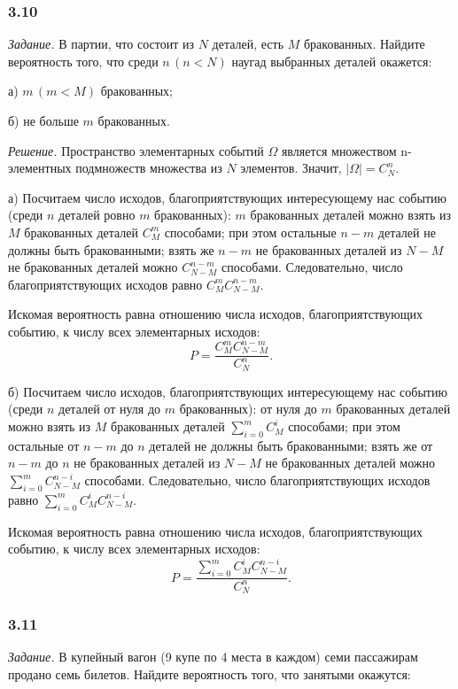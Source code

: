 \documentclass{book}
\begin{document}
\subsubsection*{3.10}

\textit{Задание.} В партии, что состоит из $N$ деталей, есть $M$ бракованных.
Найдите вероятность того, что среди $n \, \left( n < N \right)$ наугад выбранных деталей окажется:

а) $m \, \left( m < M \right) $ бракованных;

б) не больше $m$ бракованных.

\textit{Решение.} Пространство элементарных событий $ \Omega $ является множеством n-элементных подмножеств множества из $N$ элементов.
Значит, $| \Omega | = C_N^n$.

а) Посчитаем число исходов,
благоприятствующих интересующему нас событию
(среди $n$ деталей ровно $m$ бракованных):
$m$ бракованных деталей можно взять из $M$ бракованных деталей $C_M^m$ способами;
при этом остальные $n - m$ деталей не должны быть бракованными;
взять же $n - m$ не бракованных деталей из $N - M$ не бракованных деталей можно $C_{N-M}^{n-m}$ способами.
Следовательно, число благоприятствующих исходов равно $C_M^m C_{N-M}^{n-m}$.

Искомая вероятность равна отношению числа исходов, благоприятствующих событию, к числу всех элементарных исходов:
$$P =
\frac{C_M^m C_{N-M}^{n-m}}{C_N^n}.$$

б) Посчитаем число исходов,
благоприятствующих интересующему нас событию
(среди $n$ деталей от нуля до $m$ бракованных):
от нуля до $m$ бракованных деталей можно взять из $M$ бракованных деталей $ \sum \limits_{i=0}^m C_M^i$ способами;
при этом остальные от $n - m$ до $n$ деталей не должны быть бракованными;
взять же от $n - m$ до $n$ не бракованных деталей из $N - M$ не бракованных деталей можно $ \sum \limits_{i=0}^m C_{N-M}^{n-i}$ способами.
Следовательно, число благоприятствующих исходов равно $ \sum \limits_{i=0}^m C_M^i C_{N-M}^{n-i}$.

Искомая вероятность равна отношению числа исходов, благоприятствующих событию, к числу всех элементарных исходов:
$$P =
\frac{ \sum \limits_{i=0}^m C_M^i C_{N-M}^{n-i}}{C_N^n}.$$

\subsubsection*{3.11}

\textit{Задание.} В купейный вагон (9 купе по 4 места в каждом) семи пассажирам продано семь билетов.
Найдите вероятность того, что занятыми окажутся:
\end{document}
